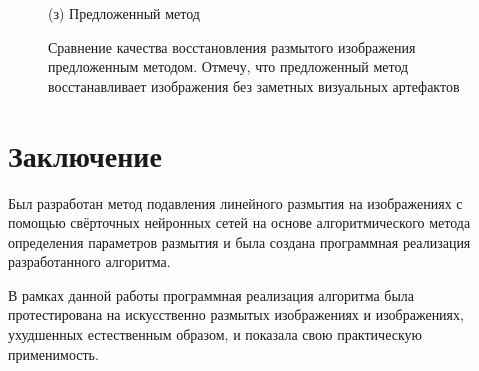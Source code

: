 \begin{figure}[H]
\begin{minipage}[t]{0.22\linewidth}
(з) Предложенный метод\\
\end{minipage}

\caption{Сравнение качества восстановления размытого изображения предложенным методом. Отмечу, что предложенный метод восстанавливает изображения без заметных визуальных артефактов}
\label{ris:restore_example_big}
\end{figure}


\newpage
\section{Заключение}
Был разработан метод подавления линейного размытия на изображениях с помощью свёрточных нейронных сетей на основе алгоритмического метода определения параметров размытия и была создана программная реализация разработанного алгоритма.

В рамках данной работы программная реализация алгоритма была протестирована
на искусственно размытых изображениях и изображениях, ухудшенных естественным образом, и показала свою практическую применимость.


\newpage
\printbibliography[heading=bibintoc]

